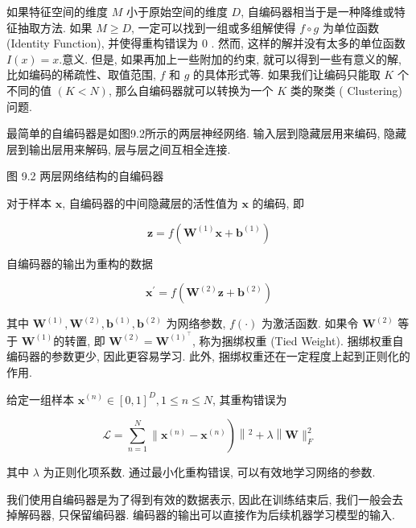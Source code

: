 \documentclass[10pt]{article}
\begin{document}
如果特征空间的维度 $M$ 小于原始空间的维度 $D$, 自编码器相当于是一种降维或特征抽取方法. 如果 $M \geq D$, 一定可以找到一组或多组解使得 $f \circ g$ 为单位函数 (Identity Function), 并使得重构错误为 0 . 然而, 这样的解并没有太多的单位函数 $I(x)=x$.意义. 但是, 如果再加上一些附加的约束, 就可以得到一些有意义的解, 比如编码的稀疏性、取值范围, $f$ 和 $g$ 的具体形式等. 如果我们让编码只能取 $K$ 个不同的值 $(K<N)$, 那么自编码器就可以转换为一个 $K$ 类的聚类 ( Clustering) 问题.

最简单的自编码器是如图9.2所示的两层神经网络. 输入层到隐藏层用来编码, 隐藏层到输出层用来解码, 层与层之间互相全连接.



图 9.2 两层网络结构的自编码器

对于样本 $\boldsymbol{x}$, 自编码器的中间隐藏层的活性值为 $\boldsymbol{x}$ 的编码, 即


\begin{equation*}
\boldsymbol{z}=f\left(\boldsymbol{W}^{(1)} \boldsymbol{x}+\boldsymbol{b}^{(1)}\right) \tag{9.20}
\end{equation*}


自编码器的输出为重构的数据


\begin{equation*}
\boldsymbol{x}^{\prime}=f\left(\boldsymbol{W}^{(2)} \boldsymbol{z}+\boldsymbol{b}^{(2)}\right) \tag{9.21}
\end{equation*}


其中 $\boldsymbol{W}^{(1)}, \boldsymbol{W}^{(2)}, \boldsymbol{b}^{(1)}, \boldsymbol{b}^{(2)}$ 为网络参数, $f(\cdot)$ 为激活函数. 如果令 $\boldsymbol{W}^{(2)}$ 等于 $\boldsymbol{W}^{(1)}$的转置, 即 $\boldsymbol{W}^{(2)}=\boldsymbol{W}^{(1)^{\top}}$, 称为捆绑权重 (Tied Weight). 捆绑权重自编码器的参数更少, 因此更容易学习. 此外, 捆绑权重还在一定程度上起到正则化的作用.

给定一组样本 $\boldsymbol{x}^{(n)} \in[0,1]^{D}, 1 \leq n \leq N$, 其重构错误为


\begin{equation*}
\left.\mathcal{L}=\sum_{n=1}^{N} \| \boldsymbol{x}^{(n)}-\boldsymbol{x}^{(n)}\right)\left\|^{2}+\lambda\right\| \boldsymbol{W} \|_{F}^{2} \tag{9.22}
\end{equation*}


其中 $\lambda$ 为正则化项系数. 通过最小化重构错误, 可以有效地学习网络的参数.

我们使用自编码器是为了得到有效的数据表示, 因此在训练结束后, 我们一般会去掉解码器, 只保留编码器. 编码器的输出可以直接作为后续机器学习模型的输入.
\end{document}
